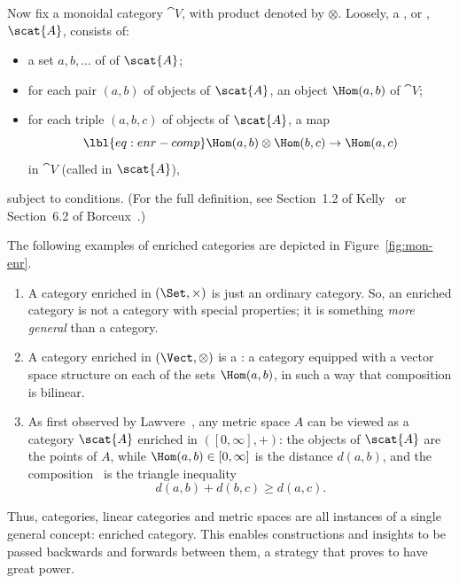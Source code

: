 Now fix a monoidal category $\cat{V}$, with product denoted by $\otimes$.
Loosely, a ,%
%
%
or ,%
%
%
$\scat{A}$, consists of:
% 
\begin{itemize}
\item 
a set $a, b, \ldots$ of  of $\scat{A}$;

\item
for each pair $(a, b)$ of objects of $\scat{A}$, an object $\Hom(a, b)$ of
$\cat{V}$;

\item
for each triple $(a, b, c)$ of objects of $\scat{A}$, a map 
% 
\begin{equation}
\lbl{eq:enr-comp}
\Hom(a, b) \otimes \Hom(b, c) \to \Hom(a, c)
\end{equation}
% 
in $\cat{V}$ (called  in $\scat{A}$),
\end{itemize}
% 
subject to conditions.  (For the full definition, see Section~1.2 of
Kelly~\cite{KellBCE} or Section~6.2 of Borceux~\cite{BorcHCA2}.)

\begin{examples}
The following examples of enriched categories are depicted in
Figure~\ref{fig:mon-enr}.
% 
\begin{enumerate}
\item 
A category enriched in $(\Set, \times)$ is just an ordinary category.  So,
an enriched category is not a category with special properties; it is
something \emph{more general} than a category.

\item
A category enriched in $(\Vect, \otimes)$ is a 
: a category equipped with a vector space structure on each of the
sets $\Hom(a, b)$, in such a way that composition is bilinear.

\item
As first observed by Lawvere~\cite{LawvMSG},%
%
% 
any metric space $A$ can be viewed as a category $\scat{A}$ enriched in
$([0, \infty], +)$: the objects of $\scat{A}$ are the points of $A$, while
$\Hom(a, b) \in [0, \infty]$ is the distance $d(a, b)$, and the
composition~ is the triangle inequality
\[
d(a, b) + d(b, c) \geq d(a, c).
\]
\end{enumerate}
\end{examples}

Thus, categories, linear categories and metric spaces are all instances of
a single general concept: enriched category.  This enables constructions
and insights to be passed backwards and forwards between them, a strategy
that proves to have great power.


